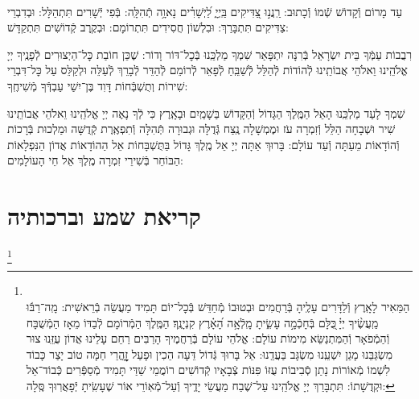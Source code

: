 \documentclass[twoside, openany, parskip=half, 11pt]{book}
\begin{document}
\\
 עַד מָרוֹם וְֿקָדוֹשׁ שְֿׁמוֹ וְֿכָתוּב: רַֽנֲנ֣וּ צַ֭דִּיקִים בַּֽיְיָ֑ לַ֝יְשָׁרִ֗ים נָאוָ֥ה תְֿהִלָּֽה: בְּֿפִי יְֿשָׁרִים תִּתְהַלָּל: וּבְדִבְרֵי צַדִּיקִים תִּתְבָּרַךְ: וּבִלְשׁוֹן חֲסִידִים תִּתְרוֹמָם: וּבְקֶֽרֶב קְֿדוֹשִׁים תִּתְקַדָּשׁ:

 רִבֲבוֹת עַמְּֿךָ בֵּית יִשְׂרָאֵל בְּֿרִנָּה יִתְפָּאַר שִׁמְךָ מַלְכֵּֽנוּ בְּֿכׇל־דּוֹר וָדוֹר: שֶׁכֵּן חוֹבַת כׇּל־הַיְצוּרִים לְֿפָנֶֽיךָ יְיָ אֱלֹהֵֽינוּ וֵאלֹהֵי אֲבוֹתֵֽינוּ לְֿהוֹדוֹת לְֿהַלֵּל לְֿשַׁבֵּֽחַ לְֿפָאֵר לְֿרוֹמֵם לְֿהַדֵּר לְֿבָרֵךְ לְֿעַלֵּה וּלְקַלֵּס עַל כׇּל־דִּבְרֵי שִׁירוֹת וְתֻשְׁבְּֿחוֹת דָּוִד בֶּן־יִשַׁי עַבְדְּֿךָ מְֿשִׁיחֶֽךָ:


 שִׁמְךָ לָעַד מַלְכֵּֽנוּ הָאֵל הַמֶּֽלֶךְ הַגָּדוֹל וְֿהַקָּדוֹשׁ בַּשָׁמַֽיִם וּבָאָֽרֶץ כִּי לְֿךָ נָאֶה יְיָ אֱלֹהֵֽינוּ וֵאלֹהֵי אֲבוֹתֵֽינוּ שִׁיר וּשְׁבָחָה הַלֵּל וְֿזִמְרָה עֹז וּמֶמְשָׁלָה נֶֽצַח גְּֿדֻלָּה וּגְבוּרָה תְּֿהִלָּה וְֿתִפְאֶֽרֶת קְֿדֻשָּׁה וּמַלְכוּת בְּֿרָכוֹת וְֿהוֹדָאוֹת מֵעַתָּה וְֿעַד עוֹלָם:
 בָּרוּךְ אַתָּה יְיָ אֵל מֶֽלֶךְ גָּדוֹל בַּתֻּשְׁבָּחוֹת אֵל הַהוֹדָאוֹת אֲדוֹן הַנִּפְלָאוֹת הַבּוֹחֵר בְּֿשִׁירֵי זִמְרָה מֶֽלֶךְ אֵל חֵי הָעוֹלָמִים:
\mimaamakim
\halfkaddish

\section*{ קריאת שמע וברכותיה }

\barachu


\footnote{\\
הַמֵּאִיר לָאָֽרֶץ וְֿלַדָּרִים עָלֶֽיהָ בְּֿרַחֲמִים וּבְטוּבוֹ מְֿחַדֵּשׁ בְּֿכׇל־יוֹם תָּמִיד מַעֲשֵׂה בְֿרֵאשִׁית:
 מָֽה־רַבּ֬וּ מַֽעֲשֶׂ֨יךָ יְיָ֗ ֖כֻּלָּם בְּֿחָכְֿמָ֣ה עָשִׂ֑יתָ מָֽלְֿאָ֥ה הָ֝אָ֗רֶץ קִנְיָנֶֽךָ׃ הַמֶּֽלֶךְ הַמְֿרוֹמָם לְֿבַדּוֹ מֵאָז הַמְֿשֻׁבָּח וְֿהַמְֿפֹאָר וְֿהַמִּתְנַשֵּׂא מִימוֹת עוֹלָם: אֱלֹהֵי עוֹלָם בְּֿרַחֲמֶיךָ הָרַבִּים רַחֵם עָלֵינוּ אֲדוֹן עֻזֵּֽנוּ צוּר מִשְׂגַּבֵּנוּ מָגֵן יִשְׁעֵֽנוּ מִשְׂגָּב בַּעֲדֵֽנוּ: אֵל בָּרוּךְ גְּֿדוֹל דֵּעָה הֵכִין וּפָעַל זׇׇׇׇׇׇׇׇָהֳרֵי חַמָּה טוֹב יָצַר כָּבוֹד לִשְׁמוֹ מְֿאוֹרוֹת נָתַן סְֿבִיבוֹת עֻזּוֹ פִּנּוֹת צְֿבָאָיו קְֿדוֹשִׁים רוֹמֲמֵי שַׁדַּי תָּמִיד מְֿסַפְּֿרִים כְּֿבוֹד־אֵל וּקְדֻשָׁתוֹ: תִּתְבָּרַךְ יְיָ אֱלֹהֵֽינוּ עַל־שֶׁבַח מַעֲשֵׂי יָדֶֽיךָ וְֿעַל־מְֿאֽוֹרֵי אוֹר שֶׁעָשִֽׂיתָ יְֿפָאֲרֽוּךָ סֶּֽלָה:
}
\end{document}

